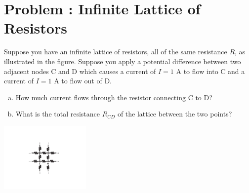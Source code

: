 \documentclass[problems]{esg8022pset}
\begin{document}
\section{Problem \thesection: Infinite Lattice of Resistors}
  Suppose you have an infinite lattice of resistors, all of the same resistance $R$, as illustrated in the figure. Suppose you apply a potential difference between two adjacent nodes C and D which causes a current of $I = 1$ A to flow into C and a current of $I = 1$ A to flow out of D.
  \begin{enumerate}[(a)]
   \item How much current flows through the resistor connecting C to D?
   \item What is the total resistance $R_{CD}$ of the lattice between the two points?
  \end{enumerate}
  \begin{center}\includegraphics[width=0.33\textwidth]{ps06_09_01}\end{center}
\end{document}
